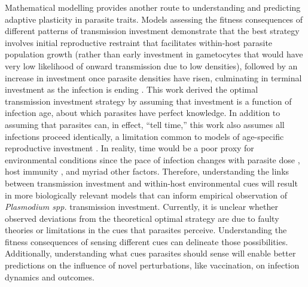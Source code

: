\documentclass[10pt,letterpaper]{article}
\begin{document}
Mathematical modelling provides another route to understanding and predicting adaptive plasticity in parasite traits. Models assessing the fitness consequences of different patterns of transmission investment demonstrate that the best strategy involves initial reproductive restraint that facilitates within-host parasite population growth (rather than early investment in gametocytes that would have very low likelihood of onward transmission due to low densities), followed by an increase in investment once parasite densities have risen, culminating in terminal investment as the infection is ending \cite{koella_optimal_1995,greischar_predicting_2016}. This work derived the optimal transmission investment strategy by assuming that investment is a function of infection age, about which parasites have perfect knowledge. In addition to assuming that parasites can, in effect, ``tell time,'' this work also assumes all infections proceed identically, a limitation common to models of age-specific reproductive investment \cite{pianka_age-specific_1975}. In reality, time would be a poor proxy for environmental conditions since the pace of infection changes with parasite dose \cite{timms_effect_2001, metcalf_partitioning_2011}, host immunity \cite{barclay_cd4t_2008, metcalf_partitioning_2011}, and myriad other factors. Therefore, understanding the links between transmission investment and within-host environmental cues will result in more biologically relevant models that can inform empirical observation of \emph{Plasmodium spp.} transmission investment. Currently, it is unclear whether observed deviations from the theoretical optimal strategy are due to faulty theories or limitations in the cues that parasites perceive. Understanding the fitness consequences of sensing different cues can delineate those possibilities. Additionally, understanding what cues parasites should sense will enable better predictions on the influence of novel perturbations, like vaccination, on infection dynamics and outcomes.\newline
\end{document}
